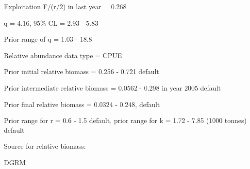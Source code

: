 \documentclass[12pt,a4paper]{article}\usepackage[]{graphicx}\usepackage[]{xcolor}
\begin{document}
Exploitation F/(r/2) in last year = 0.268

q = 4.16, 95\% CL = 2.93 - 5.83

Prior range of q = 1.03 - 18.8

Relative abundance data type = CPUE

Prior initial relative biomass = 0.256 - 0.721 default

Prior intermediate relative biomass = 0.0562 - 0.298 in year 2005 default

Prior final relative biomass = 0.0324 - 0.248, default

Prior range for r = 0.6 - 1.5 default, prior range for k = 1.72 - 7.85 (1000 tonnes) default

Source for relative biomass: 

DGRM

    
\end{document}
